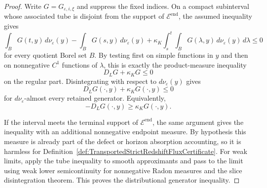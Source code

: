 \begin{proof}
Write $G=G_{\varepsilon,i,\xi}$ and suppress the fixed indices.  On a compact subinterval whose associated tube is disjoint from the support of $\mathcal E^{\mathrm{end}}$, the assumed inequality gives
\[
    \int_B G(t,y)\,d\nu_\varepsilon(y)
    -
    \int_B G(s,y)\,d\nu_\varepsilon(y)
    +
    \kappa_K
    \int_s^t\int_B G(\lambda,y)\,d\nu_\varepsilon(y)\,d\lambda
    \le 0
\]
for every quotient Borel set $B$.  By testing first on simple functions in $y$ and then on nonnegative $C^1$ functions of $\lambda$, this is exactly the product-measure inequality
\[
    D_LG+\kappa_KG\le0
\]
on the regular part.  Disintegrating with respect to $d\nu_\varepsilon(y)$ gives
\[
    D_LG(\cdot,y)+\kappa_KG(\cdot,y)\le0
\]
for $d\nu_\varepsilon$-almost every retained generator.  Equivalently,
\[
    -D_LG(\cdot,y)\ge \kappa_KG(\cdot,y).
\]

If the interval meets the terminal support of $\mathcal E^{\mathrm{end}}$, the same argument gives the inequality with an additional nonnegative endpoint measure.  By hypothesis this measure is already part of the defect or horizon absorption accounting, so it is harmless for Definition~\ref{def:TransportedStrictRedshiftFluxCertificate}.  For weak limits, apply the tube inequality to smooth approximants and pass to the limit using weak lower semicontinuity for nonnegative Radon measures and the slice disintegration theorem.  This proves the distributional generator inequality.
\end{proof}

